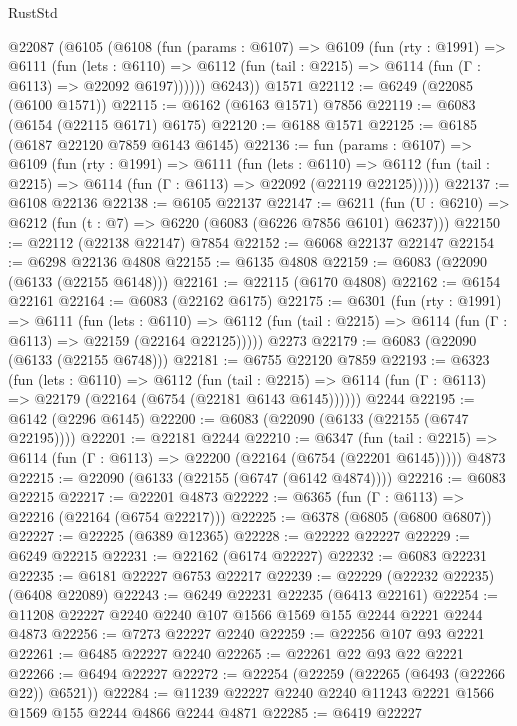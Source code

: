 \begin{lexlean}{RustStd}
\begin{coremodule}
    @22087
      (@6105
        (@6108
          (fun (params : @6107) =>
          @6109
            (fun (rty : @1991) =>
            @6111
              (fun (lets : @6110) =>
              @6112 (fun (tail : @2215) => @6114 (fun (Γ : @6113) => @22092 @6197))))))
        @6243))
    @1571
@22112 := @6249 (@22085 (@6100 @1571))
@22115 := @6162 (@6163 @1571) @7856
@22119 := @6083 (@6154 (@22115 @6171) @6175)
@22120 := @6188 @1571
@22125 := @6185 (@6187 @22120 @7859 @6143 @6145)
@22136 := fun (params : @6107) =>
  @6109
    (fun (rty : @1991) =>
    @6111
      (fun (lets : @6110) =>
      @6112 (fun (tail : @2215) => @6114 (fun (Γ : @6113) => @22092 (@22119 @22125)))))
@22137 := @6108 @22136
@22138 := @6105 @22137
@22147 := @6211 (fun (U : @6210) => @6212 (fun (t : @7) => @6220 (@6083 (@6226 @7856 @6101) @6237)))
@22150 := @22112 (@22138 @22147) @7854
@22152 := @6068 @22137 @22147
@22154 := @6298 @22136 @4808
@22155 := @6135 @4808
@22159 := @6083 (@22090 (@6133 (@22155 @6148)))
@22161 := @22115 (@6170 @4808)
@22162 := @6154 @22161
@22164 := @6083 (@22162 @6175)
@22175 := @6301
    (fun (rty : @1991) =>
    @6111
      (fun (lets : @6110) =>
      @6112 (fun (tail : @2215) => @6114 (fun (Γ : @6113) => @22159 (@22164 @22125)))))
    @2273
@22179 := @6083 (@22090 (@6133 (@22155 @6748)))
@22181 := @6755 @22120 @7859
@22193 := @6323
    (fun (lets : @6110) =>
    @6112
      (fun (tail : @2215) =>
      @6114 (fun (Γ : @6113) => @22179 (@22164 (@6754 (@22181 @6143 @6145))))))
    @2244
@22195 := @6142 (@2296 @6145)
@22200 := @6083 (@22090 (@6133 (@22155 (@6747 @22195))))
@22201 := @22181 @2244
@22210 := @6347
    (fun (tail : @2215) => @6114 (fun (Γ : @6113) => @22200 (@22164 (@6754 (@22201 @6145)))))
    @4873
@22215 := @22090 (@6133 (@22155 (@6747 (@6142 @4874))))
@22216 := @6083 @22215
@22217 := @22201 @4873
@22222 := @6365 (fun (Γ : @6113) => @22216 (@22164 (@6754 @22217)))
@22225 := @6378 (@6805 (@6800 @6807))
@22227 := @22225 (@6389 @12365)
@22228 := @22222 @22227
@22229 := @6249 @22215
@22231 := @22162 (@6174 @22227)
@22232 := @6083 @22231
@22235 := @6181 @22227 @6753 @22217
@22239 := @22229 (@22232 @22235) (@6408 @22089)
@22243 := @6249 @22231 @22235 (@6413 @22161)
@22254 := @11208 @22227 @2240 @2240 @107 @1566 @1569 @155 @2244 @2221 @2244 @4873
@22256 := @7273 @22227 @2240
@22259 := @22256 @107 @93 @2221
@22261 := @6485 @22227 @2240
@22265 := @22261 @22 @93 @22 @2221
@22266 := @6494 @22227
@22272 := @22254 (@22259 (@22265 (@6493 (@22266 @22)) @6521))
@22284 := @11239 @22227 @2240 @2240 @11243 @2221 @1566 @1569 @155 @2244 @4866 @2244 @4871
@22285 := @6419 @22227

\end{coremodule}
\end{lexlean}
